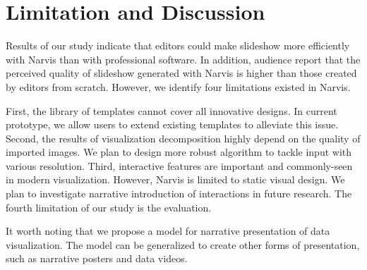 \section{Limitation and Discussion}
Results of our study indicate that editors could make slideshow more efficiently with Narvis than with professional software. In addition, audience report that the perceived quality of slideshow generated with Narvis is higher than those created by editors from scratch. However, we identify four limitations existed in Narvis.

First, the library of templates cannot cover all innovative designs. In current prototype, we allow users to extend existing templates to alleviate this issue. 
Second, the results of visualization decomposition highly depend on the quality of imported images. We plan to design more robust algorithm to tackle input with various resolution.
Third, interactive features are important and commonly-seen in modern visualization. However, Narvis is limited to static visual design. We plan to investigate narrative introduction of interactions in future research. The fourth limitation of our study is the evaluation. 

It worth noting that we propose a model for narrative presentation of data visualization. The model can be generalized to create other forms of presentation, such as narrative posters and data videos. 




